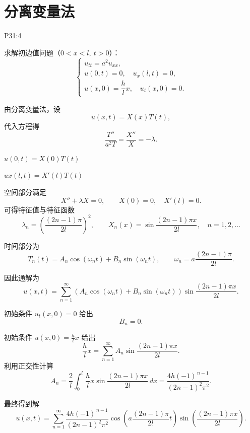 \section{分离变量法}
P31:4
\begin{homework}[1(2)]
求解初边值问题（$0<x<l,\ t>0$）：
\[
\begin{cases}
u_{tt}=a^{2}u_{xx},\\[3pt]
u(0,t)=0,\quad u_x(l,t)=0,\\[3pt]
u(x,0)=\dfrac{h}{l}x,\quad u_t(x,0)=0.
\end{cases}
\]
\end{homework}
\begin{solution}
由分离变量法，设
\[
u(x,t)=X(x)T(t),
\]
代入方程得
\[
\frac{T''}{a^{2}T}=\frac{X''}{X}=-\lambda .
\]
\begin{dxtips}
    $u(0,t)=X(0)T(t)$
    
    $
    ux(l,t)=X'(l)T(t)$
\end{dxtips}
空间部分满足
\[
X''+\lambda X=0,\qquad X(0)=0,\quad X'(l)=0.
\]
可得特征值与特征函数
\[
\lambda_n=\left(\frac{(2n-1)\pi}{2l}\right)^2,\qquad
X_n(x)=\sin\frac{(2n-1)\pi x}{2l},\quad n=1,2,\dots
\]

时间部分为
\[
T_n(t)=A_n\cos(\omega_n t)+B_n\sin(\omega_n t),
\qquad
\omega_n=a\frac{(2n-1)\pi}{2l}.
\]

因此通解为
\[
u(x,t)=\sum_{n=1}^{\infty}
\left(A_n\cos(\omega_n t)+B_n\sin(\omega_n t)\right)
\sin\frac{(2n-1)\pi x}{2l}.
\]

初始条件 $u_t(x,0)=0$ 给出
\[
B_n=0.
\]

初始条件 $u(x,0)=\frac{h}{l}x$ 给出
\[
\frac{h}{l}x=\sum_{n=1}^{\infty} A_n
\sin\frac{(2n-1)\pi x}{2l}.
\]
利用正交性计算
\[
A_n=\frac{2}{l}\int_0^l \frac{h}{l}x
\sin\frac{(2n-1)\pi x}{2l}\,dx
= \frac{4h(-1)^{\,n-1}}{(2n-1)^2\pi^2}.
\]

最终得到解
\[
u(x,t)=
\sum_{n=1}^{\infty}
\frac{4h(-1)^{\,n-1}}{(2n-1)^2\pi^2}
\cos\!\left(a\frac{(2n-1)\pi}{2l}t\right)
\sin\!\left(\frac{(2n-1)\pi x}{2l}\right).
\]
\end{solution}
